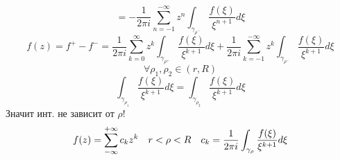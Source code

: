 \documentclass[main]{subfiles}
\begin{document}
\begin{Proof}
        \[= - \frac{1}{2\pi i} \sum_{n=-1}^{-\infty} z^n \int_{\gamma_{\rho^-}} \frac{f(\xi)}{\xi^{n+1}} d\xi\]
        \[f(z) = f^+ - f^- = \frac{1}{2\pi i} \sum_{k=0}^{\infty} z^k \int_{\gamma_{\rho^+}} \frac{f(\xi)}{\xi^{k+1}} d\xi + \frac{1}{2\pi i} \sum_{k=-1}^{-\infty} z^k \int_{\gamma_{\rho^-}} \frac{f(\xi)}{\xi^{k+1}} d\xi\]
        \[\forall \rho_1, \rho_2 \in (r, R)\]
        \[\int_{\gamma_{\rho_1}} \frac{f(\xi)}{\xi^{k+1}} d\xi = \int_{\gamma_{\rho_2}} \frac{f(\xi)}{\xi^{k+1}} d\xi\]
        Значит инт. не зависит от $\rho$!
        \[f(z) = \sum_{-\infty}^{+\infty} c_k z^k \quad r < \rho < R\quad c_k = \frac{1}{2 \pi i} \int_{\gamma_{\rho}} \frac{f(\xi)}{\xi^{k+1}} d\xi\]
    \end{Proof}
\end{document}
